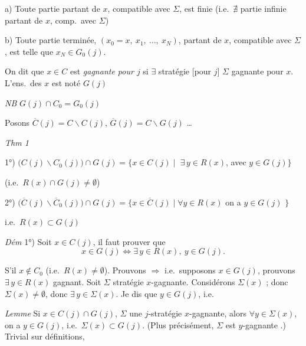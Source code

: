 \documentclass[11pt,a4paper]{article}
\begin{document}
a) Toute partie partant de $x$, compatible avec $\Sigma$, est finie (i.e.\ $\nexists$ partie infinie partant de $x$, comp.\ avec $\Sigma$)

b) \struck{\ill{}} Toute partie terminée, $(x_0=x,\ x_1,\ \ldots,\ x_N)$, partant de $x$, compatible avec $\Sigma$, est telle que $x_N\in G_0(j)$.

On dit que $x\in C$ est \emph{gagnante pour $j$} si $\exists$ stratégie [pour $j$] $\Sigma$ gagnante pour $x$. L'ens.\ des $x$ est noté $G(j)$

\emph{NB} $G(j)\cap C_0=G_0(j)$

Posons $\overline{C}(j)=C\smallsetminus C(j)$, $\overline{G}(j)=C\smallsetminus G(j)$ …

 \emph{Thm 1}

1°) $\bigl(C(j)\smallsetminus C_0(j)\bigr)\cap G(j)=\{x\in C(j)\mid$ \struck{\ill{}} $\exists\,y\in R(x)$, avec $y\in G(j)\}$

\quad (i.e.\ $R(x)\cap G(j)\neq\emptyset$)

2°) $\bigl(\overline{C}(j)\smallsetminus\overline{C}_0(j)\bigr)\cap G(j)=\{x\in\overline{C}(j)\mid \forall y\in R(x)$ on a $y\in G(j)$ $\}$

\quad i.e.\ $R(x)\subset G(j)$

\emph{Dém}  1°) Soit $x\in C(j)$, il faut prouver que
\[
  x\in G(j)\Longleftrightarrow \exists\,y\in R(x),\ y\in G(j).
\]


S'il $x\notin C_0$ (i.e.\ $R(x)\neq\emptyset$). Prouvons $\Longrightarrow$ i.e.\ supposons $x\in G(j)$, prouvons $\exists\,y\in R(x)$ gagnant. Soit $\Sigma$ stratégie \struck{\ill{}} $x$-gagnante. Considérons $\Sigma(x)$ ; donc \struck{\ill{}} $\Sigma(x)\neq\emptyset$, donc $\exists\,y\in\Sigma(x)$. Je dis que $y\in G(j)$, i.e.

\emph{Lemme} Si $x\in C(j)\cap G(j)$, $\Sigma$ une $j$-stratégie $x$-gagnante, alors $\forall y\in\Sigma(x)$, on a $y\in G(j)$, i.e.\ $\Sigma(x)\subset G(j)$. (Plus précisément, $\Sigma$ est $y$-gagnante .) 
Trivial sur définitions,
\end{document}
